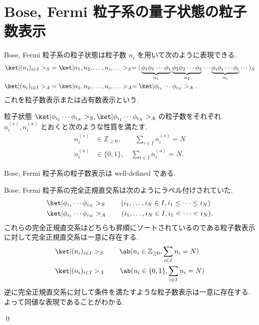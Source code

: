 \documentclass[uplatex,dvipdfmx,a4paper,11pt]{jlreq}
\makeatletter
\newcommand{\ZZ}{\mathbb{Z}}
\numberwithin{equation}{section}
\theoremstyle{definition}
\renewenvironment{proof}[1][\proofname]{\par
  \normalfont
  \topsep6\p@\@plus6\p@ \trivlist
  \item[\hskip\labelsep{\bfseries #1}\@addpunct{\bfseries}]\ignorespaces\quad\par
}{
  \qed\endtrivlist\@endpefalse
}
\renewcommand\proofname{証明}
\makeatother
\begin{document}
\section{Bose, Fermi 粒子系の量子状態の粒子数表示}
\begin{definition}
  Bose, Fermi 粒子系の粒子状態は粒子数 $n_i$ を用いて次のように表現できる.
  \begin{align}
    \ket|(n_i)_{i\in I}>_S & = \ket|n_1,n_2,\ldots,n_i,\ldots>_S = |\underbrace{\phi_1\phi_1\cdots\phi_1}_{n_1}\underbrace{\phi_2\phi_2\cdots\phi_2}_{n_2}\cdots\underbrace{\phi_i\phi_i\cdots\phi_i}_{n_i}\cdots\rangle_S \\
    \ket|(n_i)_{i\in I}>_A & = \ket|n_1,n_2,\ldots,n_i,\ldots>_A = \ket|\phi_{i_1}\cdots\phi_{i_N}>_A.
  \end{align}
  これを粒子数表示または占有数表示という.
\end{definition}
粒子状態 $\ket|\phi_{i_1}\cdots\phi_{i_N}>_S, \ket|\phi_{i_1}\cdots\phi_{i_N}>_A$ の粒子数をそれぞれ $n_i^{(s)}, n_i^{(a)}$ とおくと次のような性質を満たす.
\begin{align}
  n_i^{(s)} & \in \ZZ_{\geq 0}, \qquad \sum_{i\in I}n_i^{(s)} = N \\
  n_i^{(a)} & \in\{0, 1\}, \quad \sum_{i\in I}n_i^{(a)} = N.
\end{align}
\begin{proposition}
  Bose, Fermi 粒子系の粒子数表示は well-defined である.
  \label{particles well defined}
\end{proposition}
\begin{proof}
  Bose, Fermi 粒子系の完全正規直交系は次のようにラベル付けされていた.
  \begin{align}
     & \ket|\phi_{i_1}\cdots\phi_{i_N}>_S \qquad (i_1,\ldots,i_N\in I, i_1\leq\cdots\leq i_N) \\
     & \ket|\phi_{i_1}\cdots\phi_{i_N}>_A \qquad (i_1,\ldots,i_N\in I, i_1<\cdots<i_{N}).
  \end{align}
  これらの完全正規直交系はどちらも昇順にソートされているのである粒子数表示に対して完全正規直交系は一意に存在する.
  \begin{align}
     & \ket|(n_i)_{i\in I}>_S \qquad \ab(n_i\in\ZZ_{\geq 0}, \sum_{i\in I}n_i = N) \\
     & \ket|(n_i)_{i\in I}>_A \qquad \ab(n_i\in\{0, 1\}, \sum_{i\in I}n_i = N)
  \end{align}
  逆に完全正規直交系に対して条件を満たすような粒子数表示は一意に存在する. よって同値な表現であることがわかる.
\end{proof}
\end{document}
